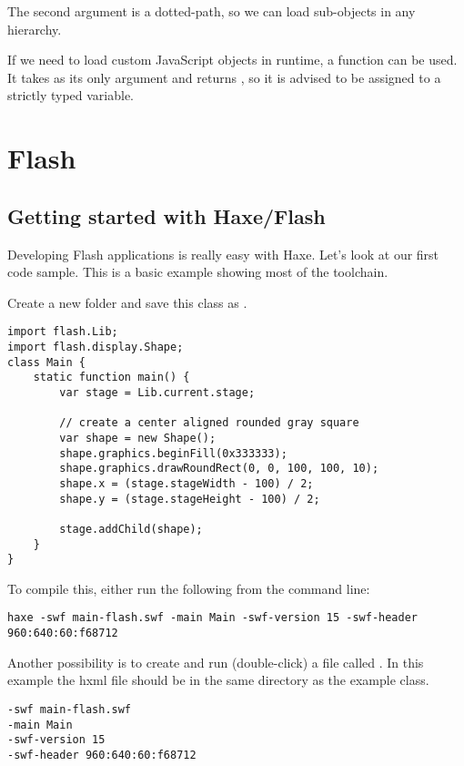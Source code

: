 
The second argument is a dotted-path, so we can load sub-objects in any hierarchy.

If we need to load custom JavaScript objects in runtime, a  function can be used. It takes  as its only argument and returns , so it is advised to be assigned to a strictly typed variable.

\section{Flash}
\label{target-flash}

\subsection{Getting started with Haxe/Flash}
\label{target-flash-getting-started}

Developing Flash applications is really easy with Haxe. Let's look at our first code sample.
This is a basic example showing most of the toolchain. 

Create a new folder and save this class as .

\begin{lstlisting}
import flash.Lib;
import flash.display.Shape;
class Main {
    static function main() {
        var stage = Lib.current.stage;
        
        // create a center aligned rounded gray square
        var shape = new Shape();
        shape.graphics.beginFill(0x333333);
		shape.graphics.drawRoundRect(0, 0, 100, 100, 10);
		shape.x = (stage.stageWidth - 100) / 2;
		shape.y = (stage.stageHeight - 100) / 2;
		
		stage.addChild(shape);
    }    
}
\end{lstlisting}

To compile this, either run the following from the command line:

\begin{lstlisting}
haxe -swf main-flash.swf -main Main -swf-version 15 -swf-header 960:640:60:f68712
\end{lstlisting}

Another possibility is to create and run (double-click) a file called . In this example the hxml file should be in the same directory as the example class.

\begin{lstlisting}
-swf main-flash.swf
-main Main
-swf-version 15
-swf-header 960:640:60:f68712
\end{lstlisting}

